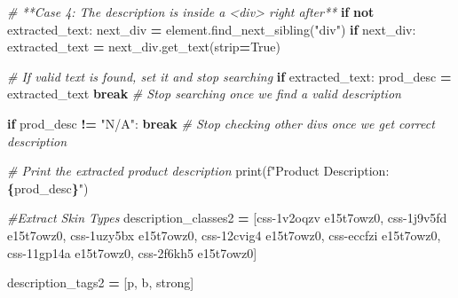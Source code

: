 \documentclass[
]{article}
\newenvironment{Shaded}{\begin{snugshade}}{\end{snugshade}}
\newcommand{\BuiltInTok}[1]{#1}
\newcommand{\CommentTok}[1]{\textcolor[rgb]{0.56,0.35,0.01}{\textit{#1}}}
\newcommand{\ControlFlowTok}[1]{\textcolor[rgb]{0.13,0.29,0.53}{\textbf{#1}}}
\newcommand{\KeywordTok}[1]{\textcolor[rgb]{0.13,0.29,0.53}{\textbf{#1}}}
\newcommand{\NormalTok}[1]{#1}
\newcommand{\OperatorTok}[1]{\textcolor[rgb]{0.81,0.36,0.00}{\textbf{#1}}}
\newcommand{\SpecialCharTok}[1]{\textcolor[rgb]{0.81,0.36,0.00}{\textbf{#1}}}
\newcommand{\SpecialStringTok}[1]{\textcolor[rgb]{0.31,0.60,0.02}{#1}}
\newcommand{\StringTok}[1]{\textcolor[rgb]{0.31,0.60,0.02}{#1}}
\newcommand{\VariableTok}[1]{\textcolor[rgb]{0.00,0.00,0.00}{#1}}
\begin{document}
\begin{Shaded}
\begin{Highlighting}[]
                \CommentTok{\# **Case 4: The description is inside a \textasciigrave{}\textless{}div\textgreater{}\textasciigrave{} right after**}
                \ControlFlowTok{if} \KeywordTok{not}\NormalTok{ extracted\_text:}
\NormalTok{                  next\_div }\OperatorTok{=}\NormalTok{ element.find\_next\_sibling(}\StringTok{"div"}\NormalTok{)}
                  \ControlFlowTok{if}\NormalTok{ next\_div:}
\NormalTok{                    extracted\_text }\OperatorTok{=}\NormalTok{ next\_div.get\_text(strip}\OperatorTok{=}\VariableTok{True}\NormalTok{)}

                \CommentTok{\# If valid text is found, set it and stop searching}
                \ControlFlowTok{if}\NormalTok{ extracted\_text:}
\NormalTok{                  prod\_desc }\OperatorTok{=}\NormalTok{ extracted\_text}
                  \ControlFlowTok{break} \CommentTok{\# Stop searching once we find a valid description}

            \ControlFlowTok{if}\NormalTok{ prod\_desc }\OperatorTok{!=} \StringTok{"N/A"}\NormalTok{:}
              \ControlFlowTok{break}  \CommentTok{\# Stop checking other divs once we get correct description}

        \CommentTok{\# Print the extracted product description}
        \BuiltInTok{print}\NormalTok{(}\SpecialStringTok{f"Product Description: }\SpecialCharTok{\{}\NormalTok{prod\_desc}\SpecialCharTok{\}}\SpecialStringTok{"}\NormalTok{)}

        \CommentTok{\#Extract Skin Types}
\NormalTok{        description\_classes2 }\OperatorTok{=}\NormalTok{ [}\StringTok{\textquotesingle{}css{-}1v2oqzv e15t7owz0\textquotesingle{}}\NormalTok{,}
                              \StringTok{\textquotesingle{}css{-}1j9v5fd e15t7owz0\textquotesingle{}}\NormalTok{, }
                              \StringTok{\textquotesingle{}css{-}1uzy5bx e15t7owz0\textquotesingle{}}\NormalTok{, }
                              \StringTok{\textquotesingle{}css{-}12cvig4 e15t7owz0\textquotesingle{}}\NormalTok{, }
                              \StringTok{\textquotesingle{}css{-}eccfzi e15t7owz0\textquotesingle{}}\NormalTok{, }
                              \StringTok{\textquotesingle{}css{-}11gp14a e15t7owz0\textquotesingle{}}\NormalTok{, }
                              \StringTok{\textquotesingle{}css{-}2f6kh5 e15t7owz0\textquotesingle{}}\NormalTok{]}

\NormalTok{        description\_tags2 }\OperatorTok{=}\NormalTok{ [}\StringTok{\textquotesingle{}p\textquotesingle{}}\NormalTok{, }\StringTok{\textquotesingle{}b\textquotesingle{}}\NormalTok{, }\StringTok{\textquotesingle{}strong\textquotesingle{}}\NormalTok{]}


\end{Highlighting}
\end{Shaded}
\end{document}
